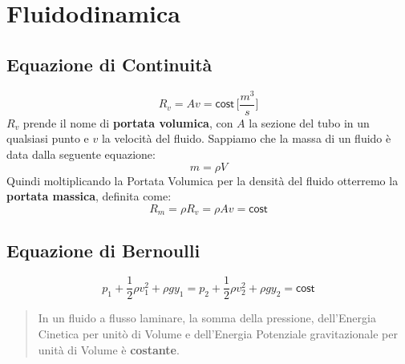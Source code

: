 \chapter*{Fluidodinamica}

    \section*{Equazione di Continuità} 
        \begin{equation*}
            R_v = Av = \textsf{cost} \, \Bigg[\frac{m^3}{s}\Bigg]
        \end{equation*}
    $R_v$ prende il nome di \textbf{portata volumica}, con $A$ la sezione del 
    tubo in un qualsiasi punto e $v$ la velocità del fluido.
    Sappiamo che la massa di un fluido è data dalla seguente equazione:
        \begin{equation*}
            m = \rho V
        \end{equation*}
    Quindi moltiplicando la Portata Volumica per la densità del fluido 
    otterremo la \textbf{portata massica}, definita come:
        \begin{equation*}
            R_m = \rho R_v = \rho A v = \textsf{cost}
        \end{equation*}

    \section*{Equazione di Bernoulli} 
        \begin{equation*}
            p_1 + \frac{1}{2}\rho v^2_1 + \rho g y_1 
            =
            p_2 + \frac{1}{2}\rho v^2_2 + \rho g y_2 
            = 
            \textsf{cost}
        \end{equation*}
        \begin{quote}
            In un fluido a flusso laminare, la somma della pressione, 
            dell'Energia Cinetica per unitò di Volume e dell'Energia 
            Potenziale gravitazionale per unità di Volume è 
            \textbf{costante}.
        \end{quote}
